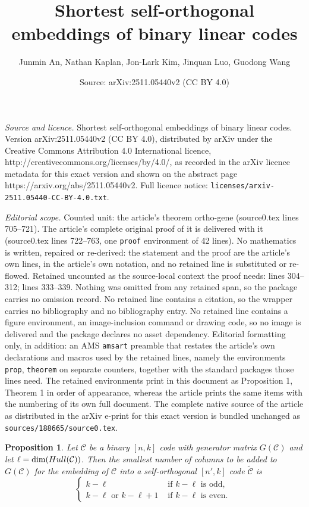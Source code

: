 \documentclass[10pt,a4paper]{amsart}
\title{Shortest self-orthogonal embeddings of binary linear codes}
\author{Junmin An, Nathan Kaplan, Jon-Lark Kim, Jinquan Luo, Guodong Wang}
\date{Source: arXiv:2511.05440v2 (CC BY 4.0)}
\newtheorem{prop}{Proposition}
\begin{document}
\maketitle

\noindent\emph{Source and licence.} Shortest self-orthogonal embeddings of binary linear codes. Version arXiv:2511.05440v2 (CC BY 4.0), distributed by arXiv under the Creative Commons Attribution 4.0 International licence, http://creativecommons.org/licenses/by/4.0/, as recorded in the arXiv licence metadata for this exact version and shown on the abstract page https://arxiv.org/abs/2511.05440v2. Full licence notice: \texttt{licenses/arxiv-2511.05440-CC-BY-4.0.txt}.\par\smallskip

\noindent\textit{Editorial scope.} Counted unit: the article's theorem ortho-gene (source0.tex lines 705--721). The article's complete original proof of it is delivered with it (source0.tex lines 722--763, one \texttt{proof} environment of 42 lines). No mathematics is written, repaired or re-derived: the statement and the proof are the article's own lines, in the article's own notation, and no retained line is substituted or re-flowed.  Retained uncounted as the source-local context the proof needs: lines 304--312; lines 333--339.  Nothing was omitted from any retained span, so the package carries no omission record.  No retained line contains a citation, so the wrapper carries no bibliography and no bibliography entry.  No retained line contains a figure environment, an image-inclusion command or drawing code, so no image is delivered and the package declares no asset dependency.  Editorial formatting only, in addition: an AMS \texttt{amsart} preamble that restates the article's own declarations and macros used by the retained lines, namely the environments \texttt{prop}, \texttt{theorem} on separate counters, together with the standard packages those lines need.  The retained environments print in this document as Proposition 1, Theorem 1 in order of appearance, whereas the article prints the same items with the numbering of its own full document.  The complete native source of the article as distributed in the arXiv e-print for this exact version is bundled unchanged as \texttt{sources/188665/source0.tex}.
\begin{prop} \label{thm-hull}
Let $\mathcal C$ be a binary $[n, k]$ code with generator matrix $G(\mathcal C)$ and let $\ell =\dim({\rm{Hull}}(\mathcal C))$. Then the smallest number of columns to be added to $G(\mathcal C)$ for the embedding of $\mathcal C$ into a self-orthogonal $[n', k]$ code $\tilde{\mathcal{C}}$ is
\[
\begin{cases}
 k - \ell & {\mbox{ if }} k - \ell {\mbox{ is odd, }} \\
 k - \ell {\mbox{ or }} k- \ell +1 & {\mbox{ if }} k - \ell {\mbox{ is even. }}
\end{cases}
\]
\end{prop}
\end{document}
